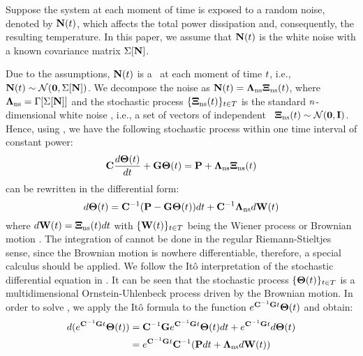 Suppose the system at each moment of time is exposed to a random noise, denoted by $\mathbf{N}(t)$, which affects the total power dissipation and, consequently, the resulting temperature. In this paper, we assume that $\mathbf{N}(t)$ is the white noise with a known covariance matrix $\Sigma[\mathbf{N}]$.

Due to the assumptions, $\mathbf{N}(t)$ is a \mnrv\ at each moment of time $t$, i.e., $\mathbf{N}(t) \sim \mathcal{N}(\mathbf{0}, \Sigma[\mathbf{N}])$. We decompose the noise as $\mathbf{N}(t) = \mathbf{\Lambda}_{\text{ns}} \mathbf{\Xi}_{\text{ns}}(t)$, where $\mathbf{\Lambda}_{\text{ns}} = \Gamma[\Sigma[\mathbf{N}]]$ and the stochastic process $\{ \mathbf{\Xi}_{\text{ns}}(t) \}_{t \in T}$ is the standard $n$-dimensional white noise \cite{oksendal2003}, i.e., a set of vectors of independent \snrvs\ $\mathbf{\Xi}_{\text{ns}}(t) \sim \mathcal{N}(\mathbf{0}, \mathbf{I})$. Hence, using , we have the following stochastic process within one time interval of constant power:
\begin{equation} \equlabel{fourier-noise}
  \mcapacitance \frac{d\vtemp(\time)}{d\time} + \mconductance \vtemp(\time) = \vpower + \ddev{\noisy} \vnormal_\noisy(\time)
\end{equation}
 can be rewritten in the differential form:
\begin{equation} \equlabel{fourier-wiener}
  d\vtemp(\time) = \mcapacitance^{-1} (\vpower - \mconductance \vtemp(\time))d\time + \mcapacitance^{-1} \ddev{\noisy} d\m{W}(\time)
\end{equation}
where $d\mathbf{W}(t) = \mathbf{\Xi}_{\text{ns}}(t) dt$ with $\{ \mathbf{W}(t) \}_{t \in T}$ being the Wiener process or Brownian motion \cite{oksendal2003}. The integration of  cannot be done in the regular Riemann-Stieltjes sense, since the Brownian motion is nowhere differentiable, therefore, a special calculus should be applied. We follow the It\^{o} interpretation \cite{oksendal2003} of the stochastic differential equation in . It can be seen that the stochastic process $\{ \mathbf{\Theta}(t) \}_{t \in T}$ is a multidimensional Ornstein-Uhlenbeck process \cite{kloeden1992} driven by the Brownian motion. In order to solve , we apply the It\^{o} formula \cite{oksendal2003} to the function $e^{ \mathbf{C}^{-1} \mathbf{G} t} \mathbf{\Theta}(t)$ and obtain:
\begin{align*}
  d(e^{\mathbf{C}^{-1} \mathbf{G} t} \mathbf{\Theta}(t)) & = \mathbf{C}^{-1} \mathbf{G} e^{\mathbf{C}^{-1} \mathbf{G} t} \mathbf{\Theta}(t) dt + e^{\mathbf{C}^{-1} \mathbf{G} t} d\mathbf{\Theta}(t) \\
  & = e^{\mathbf{C}^{-1} \mathbf{G} t} \mathbf{C}^{-1} (\mathbf{P} dt + \mathbf{\Lambda}_{\text{ns}} d\mathbf{W}(t))
\end{align*}
